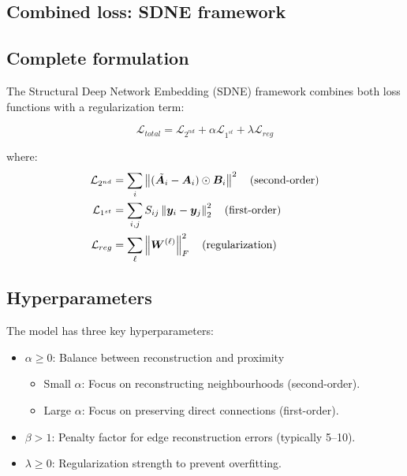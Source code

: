 \begin{notechapter}
\section{Combined loss: SDNE framework}

\subsection{Complete formulation}

The Structural Deep Network Embedding (SDNE) framework combines both loss functions with a regularization term:

\begin{equation}
\mathcal{L}_{total} = \mathcal{L}_{2^{nd}} + \alpha \mathcal{L}_{1^{st}} + \lambda \mathcal{L}_{reg}
\label{graph-autoencoders:eq:total_loss}
\end{equation}

where:
\begin{align}
\mathcal{L}_{2^{nd}} &= \sum_{i} \left\|(\tilde{\bm{A}}_i - \bm{A}_i) \odot \bm{B}_i\right\|^2 \quad \text{(second-order)} \\
\mathcal{L}_{1^{st}} &= \sum_{i,j} S_{ij} \left\|\bm{y}_i - \bm{y}_j\right\|^2_2 \quad \text{(first-order)} \\
\mathcal{L}_{reg} &= \sum_{\ell} \left\|\bm{W}^{(\ell)}\right\|^2_F \quad \text{(regularization)}
\end{align}

\subsection{Hyperparameters}

The model has three key hyperparameters:

\begin{itemize}
    \item $\alpha \geq 0$: Balance between reconstruction and proximity
    \begin{itemize}
        \item Small $\alpha$: Focus on reconstructing neighbourhoods (second-order).
        \item Large $\alpha$: Focus on preserving direct connections (first-order).
    \end{itemize}
    \item $\beta > 1$: Penalty factor for edge reconstruction errors (typically 5--10).
    \item $\lambda \geq 0$: Regularization strength to prevent overfitting.
\end{itemize}


\end{notechapter}
